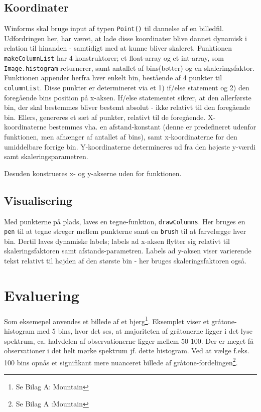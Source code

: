 \documentclass[a4paper,10pt]{article}
\begin{document}
\subsection{Koordinater}
Winforms skal bruge input af typen \texttt{Point()} til dannelse af en billedfil. Udfordringen her, har været, at lade disse koordinater blive dannet dynamisk i relation til hinanden - samtidigt med at kunne bliver skaleret. Funktionen \texttt{makeColumnList} har 4 konstruktorer; et float-array og et int-array, som \texttt{Image.histogram} returnerer, samt antallet af bins(bøtter) og en skaleringsfaktor. Funktionen appender herfra hver enkelt bin, bestående af 4 punkter til \texttt{columnList}. Disse punkter er determineret via et 1) if/else statement og 2) den foregående bins position på x-aksen. If/else statementet sikrer, at den allerførste bin, der skal bestemmes bliver bestemt absolut - ikke relativt til den foregående bin. Ellers, genereres et sæt af punkter, relativt til de foregående. X-koordinaterne bestemmes vha. en afstand-konstant (denne er predefineret udenfor funktionen, men afhænger af antallet af bins), samt x-koordinaterne for den umiddelbare forrige bin. Y-koordinaterne determineres ud fra den højeste y-værdi samt skaleringsparametren. 

Desuden konstrueres x- og y-akserne uden for funktionen. 

\subsection{Visualisering}
Med punkterne på plads, laves en tegne-funktion, \texttt{drawColumns}. Her bruges en \texttt{pen} til at tegne streger mellem punkterne samt en \texttt{brush} til at farvelægge hver bin. Dertil laves dynamiske labels; labels ad x-aksen flytter sig relativt til skaleringsfaktoren samt afstands-parametren. Labels ad y-aksen viser varierende tekst relativt til højden af den største bin - her bruges skaleringsfaktoren også.

\section{Evaluering}

Som eksemepel anvendes et billede af et bjerg\footnote{Se Bilag A: Mountain}. Eksemplet viser et gråtone-histogram med 5 bins, hvor det ses, at majoriteten af gråtonerne ligger i det lyse spektrum, ca. halvdelen af observationerne ligger mellem 50-100. Der er meget få observationer i det helt mørke spektrum jf. dette histogram. Ved at vælge f.eks. 100 bins opnås et signifikant mere nuanceret billede af gråtone-fordelingen\footnote{Se Bilag A :Mountain}.
\end{document}
